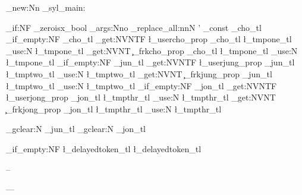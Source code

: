 \cs_new:Nn \build_syl_main:
{
	\bool_if:NF \opt_zeroisx_bool
	{
		\exp_args:Nno
		\regex_replace_all:nnN { ' } { \zero_const } \g_cho_tl
	}
	\tl_if_empty:NF \g_cho_tl
	{
		\prop_get:NVNTF \l_usercho_prop \g_cho_tl \l_tmpone_tl 
			{ \tl_use:N \l_tmpone_tl }
			{
				\prop_get:NVNT \c_frkcho_prop \g_cho_tl \l_tmpone_tl
				{ \tl_use:N \l_tmpone_tl }
			}
	}
	\tl_if_empty:NF \g_jun_tl
	{
		\prop_get:NVNTF \l_userjung_prop \g_jun_tl \l_tmptwo_tl 
			{ \tl_use:N \l_tmptwo_tl }
			{
				\prop_get:NVNT \c_frkjung_prop \g_jun_tl \l_tmptwo_tl
				{ \tl_use:N \l_tmptwo_tl }
			}
	}
	\tl_if_empty:NF \g_jon_tl 
	{
		\prop_get:NVNTF \l_userjong_prop \g_jon_tl \l_tmpthr_tl 
			{ \tl_use:N \l_tmpthr_tl }
			{
				\prop_get:NVNT \c_frkjong_prop \g_jon_tl \l_tmpthr_tl
				{ \tl_use:N \l_tmpthr_tl }
			}
	}

	\tl_gclear:N \g_jun_tl
	\tl_gclear:N \g_jon_tl

	\tl_if_empty:NF \l_delayedtoken_tl
	{
		\l_delayedtoken_tl
	}
}

\NewDocumentCommand \frdash { }
{
}

\NewDocumentCommand \frendash {}
{
	--
}

\NewDocumentCommand \fremdash {}
{
	---
}

